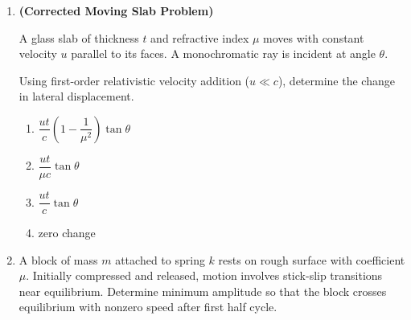 \documentclass[12pt]{article}
\begin{document}
\begin{enumerate}
\item
\textbf{(Corrected Moving Slab Problem)}

A glass slab of thickness $t$ and refractive index $\mu$ moves with constant velocity $u$ parallel to its faces. A monochromatic ray is incident at angle $\theta$.

Using first-order relativistic velocity addition ($u \ll c$), determine the change in lateral displacement.

\begin{center}
\end{center}

\begin{enumerate}
\item $\dfrac{ut}{c}\left(1-\dfrac{1}{\mu^2}\right)\tan\theta$
\item $\dfrac{ut}{\mu c}\tan\theta$
\item $\dfrac{ut}{c}\tan\theta$
\item zero change
\end{enumerate}



\item
A block of mass $m$ attached to spring $k$ rests on rough surface with coefficient $\mu$. Initially compressed and released, motion involves stick-slip transitions near equilibrium. Determine minimum amplitude so that the block crosses equilibrium with nonzero speed after first half cycle.


\end{enumerate}
\end{document}
